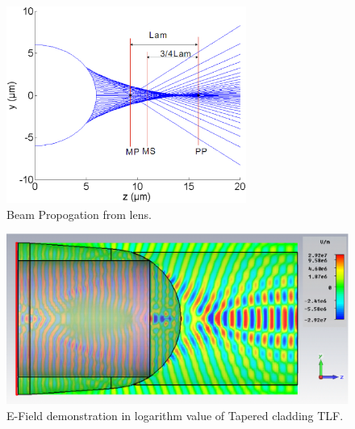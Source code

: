 \begin{figure}[!ht]
\centering
	\includegraphics[width=0.7\textwidth]{bilder/cal_min_spot}
\caption{Beam Propogation from lens.}
\label{fig:lens_spot}
\end{figure}
\begin{figure}[!ht]
	\centering
		\includegraphics[width=0.8 \textwidth]{bilder/cst_lensed_fiber_equ_efield}
		\caption{E-Field demonstration in logarithm value of Tapered cladding TLF.}
 		\label{fig:Tapered_cladding_efield}
\end{figure}

